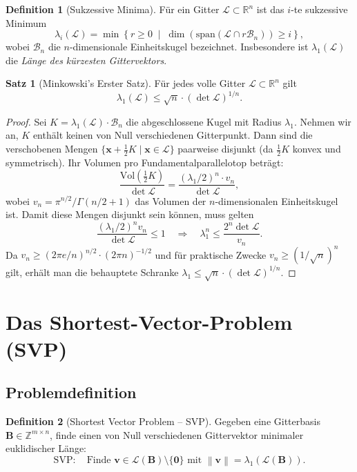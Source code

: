 ﻿\documentclass[a4paper,12pt]{article}
\theoremstyle{definition}
\newtheorem{definition}{Definition}
\newtheorem{satz}{Satz}
\newcommand{\Z}{\mathbb{Z}}
\newcommand{\R}{\mathbb{R}}
\newcommand{\Lat}{\mathcal{L}}
\newcommand{\B}{\mathbf{B}}
\newcommand{\norm}[1]{\left\|#1\right\|}
\begin{document}
\begin{definition}[Sukzessive Minima]
Für ein Gitter $\Lat \subset \R^n$ ist das $i$-te sukzessive Minimum
\[
    \lambda_i(\Lat) = \min \left\{ r \geq 0 \;\middle|\; \dim\left(\mathrm{span}\left(\Lat \cap r\mathcal{B}_n\right)\right) \geq i \right\},
\]
wobei $\mathcal{B}_n$ die $n$-dimensionale Einheitskugel bezeichnet.
Insbesondere ist $\lambda_1(\Lat)$ die \emph{Länge des kürzesten Gittervektors}.
\end{definition}

\begin{satz}[Minkowski's Erster Satz]
\label{satz:minkowski}
Für jedes volle Gitter $\Lat \subset \R^n$ gilt
\[
    \lambda_1(\Lat) \leq \sqrt{n} \cdot (\det \Lat)^{1/n}.
\]
\end{satz}

\begin{proof}
Sei $K = \lambda_1(\Lat) \cdot \mathcal{B}_n$ die abgeschlossene Kugel mit Radius $\lambda_1$.
Nehmen wir an, $K$ enthält keinen von Null verschiedenen Gitterpunkt.
Dann sind die verschobenen Mengen $\{\mathbf{x} + \tfrac{1}{2}K \mid \mathbf{x} \in \Lat\}$
paarweise disjunkt (da $\tfrac{1}{2}K$ konvex und symmetrisch).
Ihr Volumen pro Fundamentalparallelotop beträgt:
\[
    \frac{\mathrm{Vol}(\tfrac{1}{2}K)}{\det \Lat} = \frac{(\lambda_1/2)^n \cdot v_n}{\det \Lat},
\]
wobei $v_n = \pi^{n/2}/\Gamma(n/2+1)$ das Volumen der $n$-dimensionalen Einheitskugel ist.
Damit diese Mengen disjunkt sein können, muss gelten
\[
    \frac{(\lambda_1/2)^n v_n}{\det \Lat} \leq 1
    \quad \Longrightarrow \quad
    \lambda_1^n \leq \frac{2^n \det \Lat}{v_n}.
\]
Da $v_n \geq (2\pi e/n)^{n/2} \cdot (2\pi n)^{-1/2}$ und für praktische Zwecke
$v_n \geq (1/\sqrt{n})^n$ gilt, erhält man die behauptete Schranke
$\lambda_1 \leq \sqrt{n} \cdot (\det \Lat)^{1/n}$.
\end{proof}

\section{Das Shortest-Vector-Problem (SVP)}

\subsection{Problemdefinition}

\begin{definition}[Shortest Vector Problem -- SVP]
Gegeben eine Gitterbasis $\B \in \Z^{m \times n}$, finde einen von Null verschiedenen
Gittervektor minimaler euklidischer Länge:
\[
    \mathrm{SVP:} \quad \text{Finde } \mathbf{v} \in \Lat(\B) \setminus \{\mathbf{0}\}
                        \text{ mit } \norm{\mathbf{v}} = \lambda_1(\Lat(\B)).
\]
\end{definition}
\end{document}
